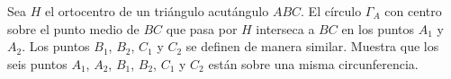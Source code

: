 Sea $H$ el ortocentro de un triángulo acutángulo $ABC$. El círculo $\Gamma_{A}$ con centro sobre el punto medio de $BC$ que pasa por $H$ interseca a $BC$ en los puntos $A_1$ y $A_2$. Los puntos $ B_{1}$, $ B_{2}$, $ C_{1}$ y $ C_{2}$ se definen de manera similar. Muestra que los seis puntos $ A_{1}$, $ A_{2}$, $ B_{1}$, $ B_{2}$, $ C_{1}$ y $ C_{2}$ están sobre una misma circunferencia.